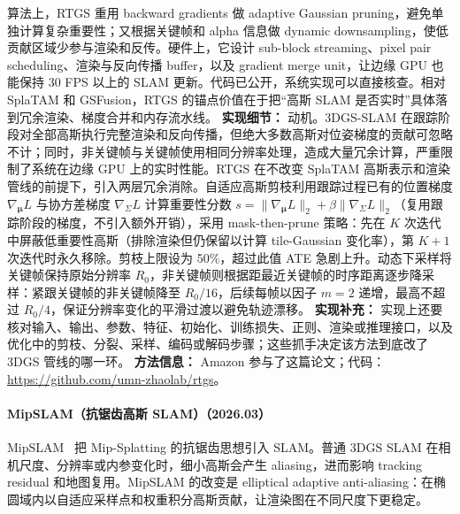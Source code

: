 算法上，RTGS 重用 backward gradients 做 adaptive Gaussian pruning，避免单独计算复杂重要性；又根据关键帧和 alpha 信息做 dynamic downsampling，使低贡献区域少参与渲染和反传。硬件上，它设计 sub-block streaming、pixel pair scheduling、渲染与反向传播 buffer，以及 gradient merge unit，让边缘 GPU 也能保持 30 FPS 以上的 SLAM 更新。代码已公开，系统实现可以直接核查。相对 SplaTAM 和 GSFusion，RTGS 的锚点价值在于把“高斯 SLAM 是否实时”具体落到冗余渲染、梯度合并和内存流水线。
\textbf{实现细节：} 动机。3DGS-SLAM 在跟踪阶段对全部高斯执行完整渲染和反向传播，但绝大多数高斯对位姿梯度的贡献可忽略不计；同时，非关键帧与关键帧使用相同分辨率处理，造成大量冗余计算，严重限制了系统在边缘 GPU 上的实时性能。RTGS 在不改变 SplaTAM 高斯表示和渲染管线的前提下，引入两层冗余消除。自适应高斯剪枝利用跟踪过程已有的位置梯度 $\nabla_{\boldsymbol{\mu}}L$ 与协方差梯度 $\nabla_{\Sigma}L$ 计算重要性分数 $s = \|\nabla_{\boldsymbol{\mu}}L\|_2 + \beta\|\nabla_{\Sigma}L\|_2$（复用跟踪阶段的梯度，不引入额外开销），采用 mask-then-prune 策略：先在 $K$ 次迭代中屏蔽低重要性高斯（排除渲染但仍保留以计算 tile-Gaussian 变化率），第 $K+1$ 次迭代时永久移除。剪枝上限设为 50\%，超过此值 ATE 急剧上升。动态下采样将关键帧保持原始分辨率 $R_0$，非关键帧则根据距最近关键帧的时序距离逐步降采样：紧跟关键帧的非关键帧降至 $R_0/16$，后续每帧以因子 $m=2$ 递增，最高不超过 $R_0/4$，保证分辨率变化的平滑过渡以避免轨迹漂移。
\textbf{实现补充：} 实现上还要核对输入、输出、参数、特征、初始化、训练损失、正则、渲染或推理接口，以及优化中的剪枝、分裂、采样、编码或解码步骤；这些抓手决定该方法到底改了 3DGS 管线的哪一环。
\textbf{方法信息：} Amazon 参与了这篇论文；代码：\url{https://github.com/umn-zhaolab/rtgs}。



\paragraph{MipSLAM（抗锯齿高斯 SLAM）（2026.03）}
MipSLAM~\cite{2603_06989} 把 Mip-Splatting 的抗锯齿思想引入 SLAM。普通 3DGS SLAM 在相机尺度、分辨率或内参变化时，细小高斯会产生 aliasing，进而影响 tracking residual 和地图复用。MipSLAM 的改变是 elliptical adaptive anti-aliasing：在椭圆域内以自适应采样点和权重积分高斯贡献，让渲染图在不同尺度下更稳定。

